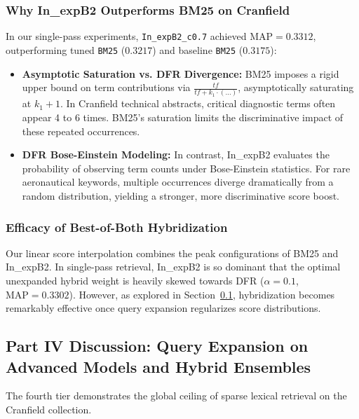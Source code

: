 \documentclass[10pt, a4paper]{article}
\begin{document}
\subsubsection{Why In\_expB2 Outperforms BM25 on Cranfield}
In our single-pass experiments, \texttt{In\_expB2\_c0.7} achieved $\text{MAP} = \mathbf{0.3312}$, outperforming tuned \texttt{BM25} ($0.3217$) and baseline \texttt{BM25} ($0.3175$):
\begin{itemize}[noitemsep,topsep=2pt]
    \item \textbf{Asymptotic Saturation vs. DFR Divergence:} BM25 imposes a rigid upper bound on term contributions via $\frac{tf}{tf + k_1 \cdot (\dots)}$, asymptotically saturating at $k_1 + 1$. In Cranfield technical abstracts, critical diagnostic terms often appear 4 to 6 times. BM25's saturation limits the discriminative impact of these repeated occurrences.
    \item \textbf{DFR Bose-Einstein Modeling:} In contrast, In\_expB2 evaluates the probability of observing term counts under Bose-Einstein statistics. For rare aeronautical keywords, multiple occurrences diverge dramatically from a random distribution, yielding a stronger, more discriminative score boost.
\end{itemize}

\subsubsection{Efficacy of Best-of-Both Hybridization}
Our linear score interpolation combines the peak configurations of BM25 and In\_expB2. In single-pass retrieval, In\_expB2 is so dominant that the optimal unexpanded hybrid weight is heavily skewed towards DFR ($\alpha=0.1$, $\text{MAP} = 0.3302$). However, as explored in Section~\ref{sec:disc_part4}, hybridization becomes remarkably effective once query expansion regularizes score distributions.

\subsection{Part IV Discussion: Query Expansion on Advanced Models and Hybrid Ensembles}
\label{sec:disc_part4}

The fourth tier demonstrates the global ceiling of sparse lexical retrieval on the Cranfield collection.
\end{document}
